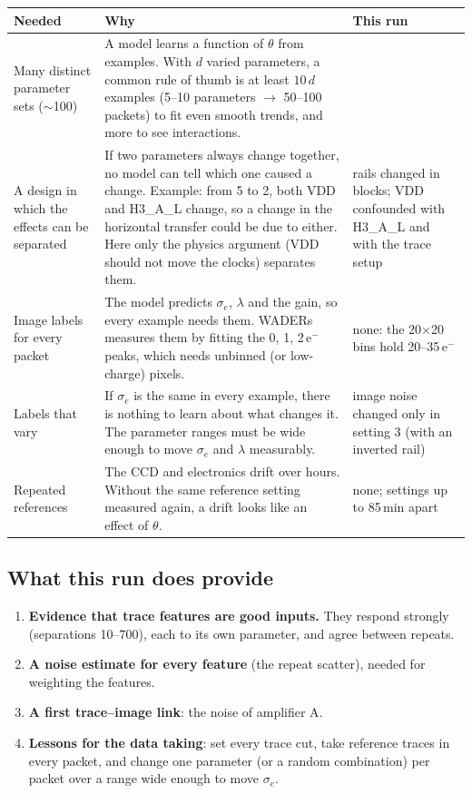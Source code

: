 \documentclass[10pt]{article}
\begin{document}
\begin{table}[H]
\centering
\begin{tabularx}{\textwidth}{>{\raggedright\arraybackslash}p{4.2cm}X>{\raggedright\arraybackslash}p{3.8cm}}
\toprule
Needed & Why & This run \\
\midrule
Many distinct parameter sets ($\sim$100) &
A model learns a function of $\theta$ from examples. With $d$ varied parameters, a common rule of thumb is at least
$10\,d$ examples (5--10 parameters $\to$ 50--100 packets) to fit even smooth trends, and more to see interactions. &
5 \\
\addlinespace
A design in which the effects can be separated &
If two parameters always change together, no model can tell which one caused a change. Example: from 5 to 2, both VDD and
H3\_A\_L change, so a change in the horizontal transfer could be due to either. Here only the physics argument
(VDD should not move the clocks) separates them. &
rails changed in blocks; VDD confounded with H3\_A\_L and with the trace setup \\
\addlinespace
Image labels for every packet &
The model predicts $\sigma_e$, $\lambda$ and the gain, so every example needs them. WADERs measures them by fitting the 0, 1,
2\,e$^-$ peaks, which needs unbinned (or low-charge) pixels. &
none: the 20$\times$20 bins hold 20--35\,e$^-$ \\
\addlinespace
Labels that vary &
If $\sigma_e$ is the same in every example, there is nothing to learn about what changes it. The parameter ranges must be wide
enough to move $\sigma_e$ and $\lambda$ measurably. &
image noise changed only in setting 3 (with an inverted rail) \\
\addlinespace
Repeated references &
The CCD and electronics drift over hours. Without the same reference setting measured again, a drift looks like an effect of
$\theta$. &
none; settings up to 85\,min apart \\
\bottomrule
\end{tabularx}
\end{table}

\subsection{What this run does provide}

\begin{enumerate}
\item \textbf{Evidence that trace features are good inputs.} They respond strongly (separations 10--700), each to its own
  parameter, and agree between repeats.
\item \textbf{A noise estimate for every feature} (the repeat scatter), needed for weighting the features.
\item \textbf{A first trace--image link}: the noise of amplifier A.
\item \textbf{Lessons for the data taking}: set every trace cut, take reference traces in every packet, and change one
  parameter (or a random combination) per packet over a range wide enough to move $\sigma_e$.
\end{enumerate}
\end{document}
